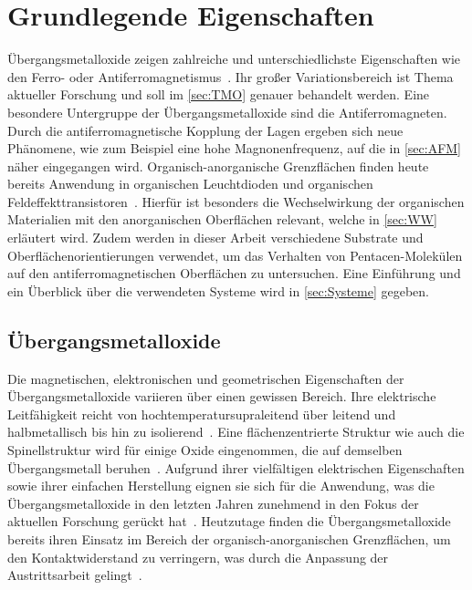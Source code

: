 \chapter{Grundlegende Eigenschaften}
    Übergangsmetalloxide zeigen zahlreiche und unterschiedlichste Eigenschaften wie den Ferro- oder Antiferromagnetismus~\cite{IF_5}.
    Ihr großer Variationsbereich ist Thema aktueller Forschung und soll im \autoref{sec:TMO} genauer behandelt werden.
    Eine besondere Untergruppe der Übergangsmetalloxide sind die Antiferromagneten.
    Durch die antiferromagnetische Kopplung der Lagen ergeben sich neue Phänomene, wie zum Beispiel eine hohe Magnonenfrequenz, auf die in \autoref{sec:AFM} näher eingegangen wird.
    Organisch-anorganische Grenzflächen finden heute bereits Anwendung in organischen Leuchtdioden und organischen Feldeffekttransistoren~\cite{IF_3}.
    Hierfür ist besonders die Wechselwirkung der organischen Materialien mit den anorganischen Oberflächen relevant, welche in \autoref{sec:WW} erläutert wird.
    Zudem werden in dieser Arbeit verschiedene Substrate und Oberflächenorientierungen verwendet, um das Verhalten von Pentacen-Molekülen auf den antiferromagnetischen Oberflächen zu untersuchen.
    Eine Einführung und ein Überblick über die verwendeten Systeme wird in \autoref{sec:Systeme} gegeben.

    \section{Übergangsmetalloxide} \label{sec:TMO}
        Die magnetischen, elektronischen und geometrischen Eigenschaften der Übergangsmetalloxide variieren über einen gewissen Bereich.
        Ihre elektrische Leitfähigkeit reicht von hochtemperatursupraleitend über leitend und halbmetallisch bis hin zu isolierend~\cite{IF_5}.
        Eine flächenzentrierte Struktur wie auch die Spinellstruktur wird für einige Oxide eingenommen, die auf demselben Übergangsmetall beruhen~\cite{FeO_26}.
        Aufgrund ihrer vielfältigen elektrischen Eigenschaften sowie ihrer einfachen Herstellung eignen sie sich für die Anwendung, was die Übergangsmetalloxide in den letzten Jahren zunehmend in den Fokus der aktuellen Forschung gerückt hat~\cite{IF_6, parkinson_iron_2016, cornell_iron_2003}.
        Heutzutage finden die Übergangsmetalloxide bereits ihren Einsatz im Bereich der organisch-anorganischen Grenzflächen, um den Kontaktwiderstand zu verringern, was durch die Anpassung der Austrittsarbeit gelingt~\cite{IF_11, NiO_40}.

